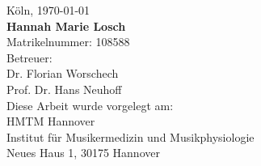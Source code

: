 \begin{titlepage}
\begin{addmargin}[\marginCoverPage]{0cm}
\vfill
\begin{center}
\begingroup
{}\selectfont
Köln, \monthyeardate\today \\
\addvspace{0.5cm}
\textbf{Hannah Marie Losch} \\
Matrikelnummer: 108588 \\
\addvspace{0.5cm}
Betreuer:\\
Dr. Florian Worschech \\
Prof. Dr. Hans Neuhoff\\
\addvspace{0.5cm}
Diese Arbeit wurde vorgelegt am:\\
HMTM Hannover \\
Institut für Musikermedizin und Musikphysiologie\\
Neues Haus 1, 30175 Hannover\\
\endgroup
\end{center}
\end{addmargin}
\end{titlepage}

